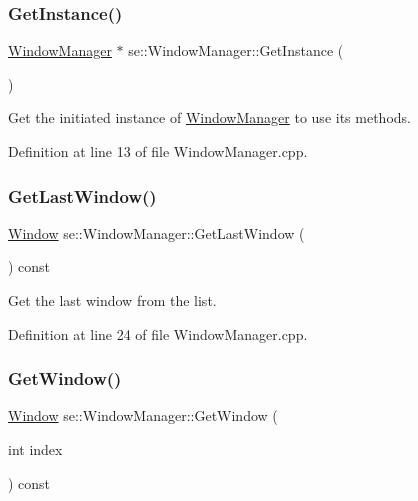 \subsubsection{\texorpdfstring{Get\+Instance()}{GetInstance()}}
{\footnotesize\ttfamily \mbox{\hyperlink{classse_1_1_window_manager}{Window\+Manager}} $\ast$ se\+::\+Window\+Manager\+::\+Get\+Instance (\begin{DoxyParamCaption}{ }\end{DoxyParamCaption})\hspace{0.3cm}{\ttfamily [static]}}

Get the initiated instance of \mbox{\hyperlink{classse_1_1_window_manager}{Window\+Manager}} to use its methods. 

Definition at line 13 of file Window\+Manager.\+cpp.

\mbox{\label{classse_1_1_window_manager_a9c1f1c2a077560a86a7c285291855dbe}} 
\subsubsection{\texorpdfstring{Get\+Last\+Window()}{GetLastWindow()}}
{\footnotesize\ttfamily \mbox{\hyperlink{classse_1_1_window}{Window}} se\+::\+Window\+Manager\+::\+Get\+Last\+Window (\begin{DoxyParamCaption}{ }\end{DoxyParamCaption}) const}

Get the last window from the list. 

Definition at line 24 of file Window\+Manager.\+cpp.

\mbox{\label{classse_1_1_window_manager_a67832360bad70a60d2241d5601bdde3a}} 
\subsubsection{\texorpdfstring{Get\+Window()}{GetWindow()}}
{\footnotesize\ttfamily \mbox{\hyperlink{classse_1_1_window}{Window}} se\+::\+Window\+Manager\+::\+Get\+Window (\begin{DoxyParamCaption}\item[{int}]{index }\end{DoxyParamCaption}) const}

